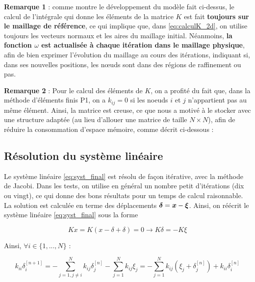 \indent \textbf{Remarque 1} : comme montre le développement du modèle fait ci-dessus, le calcul de l'intégrale qui donne les éléments de la matrice \(K\) est fait \textbf{toujours sur le maillage de référence}, ce qui implique que, dans \eqref{eq:calculK_2d}, on utilise toujours les vecteurs normaux et les aires du maillage initial. Néanmoins, \textbf{la fonction \(\omega\) est actualisée à chaque itération dans le maillage physique}, afin de bien exprimer l'évolution du maillage au cours des itérations, indiquant si, dans ses nouvelles positions, les nœuds sont dans des régions de raffinement ou pas.

\indent

\indent \textbf{Remarque 2} : Pour le calcul des éléments de \(K\), on a profité du fait que, dans la méthode d'éléments finis P1, on a \(k_{ij} = 0\) si les noeuds \(i\) et \(j\) n'appartient pas au même élément. Ainsi, la matrice est creuse, ce que nous a motivé à le stocker avec une structure adaptée (au lieu d'allouer une matrice de taille \(N \times N\)), afin de réduire la consommation d'espace mémoire, comme décrit ci-dessous : 




\subsection{Résolution du système linéaire}
\label{subsec:jacobi}

\indent Le système linéaire \eqref{eq:syst_final} est résolu de façon itérative, avec la méthode de Jacobi. Dans les tests, on utilise en général un nombre petit d'itérations (dix ou vingt), ce qui donne des bons résultats pour un temps de calcul raisonnable. La solution est calculée en terme des déplacements \(\boldsymbol{\delta} = \boldsymbol{x} - \boldsymbol{\xi}\). Ainsi, on réécrit le système linéaire \eqref{eq:syst_final} sous la forme 

\begin{equation*}
	Kx = K(x-\delta+\delta) = 0 \longrightarrow K\delta = -K\xi
\end{equation*}

\indent Ainsi, \(\forall i \in \{1,...,N\} \) :

\begin{equation*}
	k_{ii}\delta_i^{[n+1]} = -\sum_{j=1,j \neq i}^N k_{ij}\delta_{j}^{[n]} - \sum_{j=1}^N k_{ij}\xi_{j} = -\sum_{j=1}^N k_{ij}(\xi_j + \delta_{j}^{[n]}) + k_{ii}\delta_i^{[n]}
\end{equation*}

